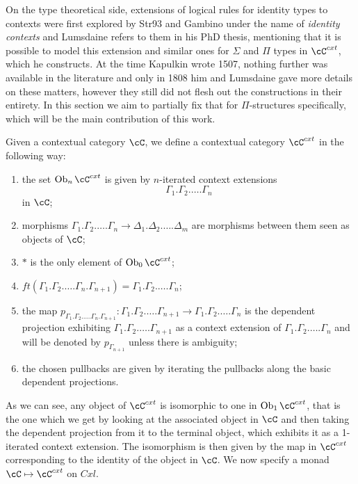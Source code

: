 \documentclass[a4paper,fontsize=12pt]{scrartcl}
\begin{document}
On the type theoretical side, extensions of logical rules for identity types to
contexts were first explored by Str93 and Gambino  under the name of
\emph{identity contexts} and Lumsdaine refers to them in his PhD thesis,
mentioning that it is possible to model this extension and similar ones for
$\Sigma$ and $\Pi$ types in $\cC^{cxt}$, which he constructs. At the time
Kapulkin wrote 1507,
nothing further was available in the literature and only in 1808 him and
Lumsdaine gave more details on these matters, however they still did not flesh
out the constructions in their entirety. In this section we aim to partially fix
that for $\Pi$-structures specifically, which will be the main contribution of
this work.

\begin{construction}
  Given a contextual category $\cC$, we define a contextual category $\cC^{cxt}$
  in the following way:
  \begin{enumerate}
    \item the set $\Ob_n\cC^{cxt}$ is given by $n$-iterated context extensions
      \[\Gamma_1.\Gamma_2.\ldots.\Gamma_n\]
      in $\cC$;
    \item morphisms
      $\Gamma_1.\Gamma_2.\ldots.\Gamma_n\rightarrow\Delta_1.\Delta_2.\ldots.\Delta_m$
      are morphisms between them seen as objects of $\cC$;
    \item $*$ is the only element of $\Ob_0\cC^{cxt}$;
    \item
      $ft(\Gamma_1.\Gamma_2.\ldots.\Gamma_n.\Gamma_{n+1})=\Gamma_1.\Gamma_2.\ldots.\Gamma_n$;
    \item the map $p_{\Gamma_1.\Gamma_2.\ldots.\Gamma_n.\Gamma_{n+1}}\colon
      \Gamma_1.\Gamma_2.\ldots.\Gamma_{n+1}\rightarrow
      \Gamma_1.\Gamma_2.\ldots.\Gamma_n$ is the dependent projection exhibiting
      $\Gamma_1.\Gamma_2.\ldots.\Gamma_{n+1}$ as a context extension of
      $\Gamma_1.\Gamma_2.\ldots.\Gamma_n$ and will be denoted by
      $p_{\Gamma_{n+1}}$ unless there is ambiguity;
    \item the chosen pullbacks are given by iterating the pullbacks along the
      basic dependent projections.
  \end{enumerate}

  As we can see, any object of $\cC^{cxt}$ is isomorphic to one in
  $\Ob_1\cC^{cxt}$, that is the one which we get by looking at the associated object
  in $\cC$ and then taking the dependent projection from it to the terminal
  object, which exhibits it as a 1-iterated context extension. The isomorphism
  is then given by the map in $\cC^{cxt}$ corresponding to the identity of the
  object in $\cC$. We now specify a monad $\cC\mapsto\cC^{cxt}$ on $Cxl$.


\end{construction}
\end{document}
